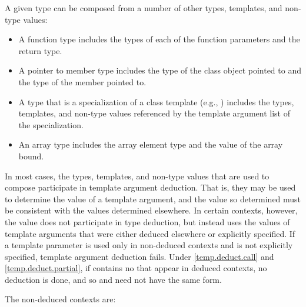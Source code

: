 \pnum
A given type
can be composed from a number of other
types, templates, and non-type values:

\begin{itemize}
\item
A function type includes the types of each of the function parameters
and the return type.
\item
A pointer to member type includes the type of the class object pointed to
and the type of the member pointed to.
\item
A type that is a specialization of a class template (e.g.,
)
includes the types, templates, and non-type values referenced by the
template argument list of the specialization.
\item
An array type includes the array element type and the value of the
array bound.
\end{itemize}

\pnum
In most cases, the types, templates, and non-type values that are used
to compose
participate in template argument deduction.
That is,
they may be used to determine the value of a template argument, and
the value so determined must be consistent with the values determined
elsewhere.
In certain contexts, however, the value does not
participate in type deduction, but instead uses the values of template
arguments that were either deduced elsewhere or explicitly specified.
If a template parameter is used only in non-deduced contexts and is not
explicitly specified, template argument deduction fails.
\enternote
Under \ref{temp.deduct.call} and \ref{temp.deduct.partial},
if  contains no  that appear
in deduced contexts, no deduction is done, and so  and 
need not have the same form.
\exitnote

\pnum
The non-deduced contexts are:

